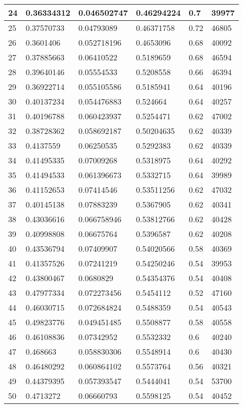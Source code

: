 \begin{longtable}{|l|l|l|l|l|l|}
24 & 0.36334312 & 0.046502747 & 0.46294224 & 0.7 & 39977 \\ \hline 
25 & 0.37570733 & 0.04793089 & 0.46371758 & 0.72 & 46805 \\ \hline 
26 & 0.3601406 & 0.052718196 & 0.4653096 & 0.68 & 40092 \\ \hline 
27 & 0.37885663 & 0.06410522 & 0.5189659 & 0.68 & 46594 \\ \hline 
28 & 0.39640146 & 0.05554533 & 0.5208558 & 0.66 & 46394 \\ \hline 
29 & 0.36922714 & 0.055105586 & 0.5185941 & 0.64 & 40196 \\ \hline 
30 & 0.40137234 & 0.054476883 & 0.524664 & 0.64 & 40257 \\ \hline 
31 & 0.40196788 & 0.060423937 & 0.5254471 & 0.62 & 47002 \\ \hline 
32 & 0.38728362 & 0.058692187 & 0.50204635 & 0.62 & 40339 \\ \hline 
33 & 0.4137559 & 0.06250535 & 0.5292383 & 0.62 & 40339 \\ \hline 
34 & 0.41495335 & 0.07009268 & 0.5318975 & 0.64 & 40292 \\ \hline 
35 & 0.41494533 & 0.061396673 & 0.5332715 & 0.64 & 39989 \\ \hline 
36 & 0.41152653 & 0.07414546 & 0.53511256 & 0.62 & 47032 \\ \hline 
37 & 0.40145138 & 0.07883239 & 0.5367905 & 0.62 & 40341 \\ \hline 
38 & 0.43036616 & 0.066758946 & 0.53812766 & 0.62 & 40428 \\ \hline 
39 & 0.40998808 & 0.06675764 & 0.5396587 & 0.62 & 40208 \\ \hline 
40 & 0.43536794 & 0.07409907 & 0.54020566 & 0.58 & 40369 \\ \hline 
41 & 0.41357526 & 0.07241219 & 0.54250246 & 0.54 & 39953 \\ \hline 
42 & 0.43800467 & 0.0680829 & 0.54354376 & 0.54 & 40408 \\ \hline 
43 & 0.47977334 & 0.072273456 & 0.5454112 & 0.52 & 47160 \\ \hline 
44 & 0.46030715 & 0.072684824 & 0.5488359 & 0.54 & 40543 \\ \hline 
45 & 0.49823776 & 0.049451485 & 0.5508877 & 0.58 & 40558 \\ \hline 
46 & 0.46108836 & 0.07342952 & 0.5532332 & 0.6 & 40240 \\ \hline 
47 & 0.468663 & 0.058830306 & 0.5548914 & 0.6 & 40430 \\ \hline 
48 & 0.46480292 & 0.060864102 & 0.5573764 & 0.56 & 40321 \\ \hline 
49 & 0.44379395 & 0.057393547 & 0.5444041 & 0.54 & 53700 \\ \hline 
50 & 0.4713272 & 0.06660793 & 0.5598125 & 0.54 & 40452 \\ \hline 
\end{longtable}